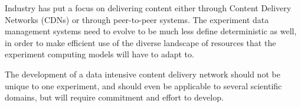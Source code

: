 Industry has put a focus on delivering content either through Content
Delivery Networks (CDNs) or through peer-to-peer systems.  The experiment data
management systems need to evolve to be much less {\color{red} define} deterministic as well, in
order to make efficient use of the diverse landscape of resources that the
experiment computing models will have to adapt to.

The development of a data intensive content delivery network should not be
unique to one experiment, and should even be applicable to several scientific
domains, but will require commitment and effort to develop.


